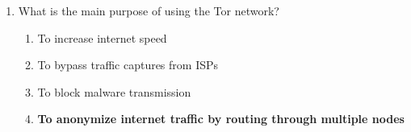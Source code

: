 \begin{enumerate}
    \item What is the main purpose of using the Tor network?
    \begin{enumerate}
        \item To increase internet speed
        \item To bypass traffic captures from ISPs
        \item To block malware transmission
        \item \textbf{To anonymize internet traffic by routing through multiple
              nodes}
    \end{enumerate}
\end{enumerate}

\newpage

